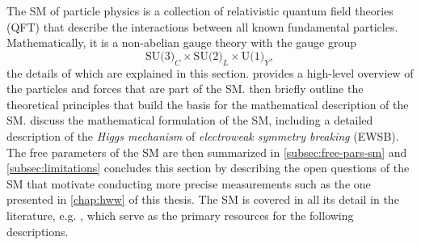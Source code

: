 

The SM of particle physics is a collection of relativistic quantum field theories (QFT) that describe the interactions between all known fundamental particles.
Mathematically, it is a non-abelian gauge theory with the gauge group
\begin{equation}
  \label{eq:sm-gauge-group}
  \text{SU(3)}_C \times \text{SU(2)}_L \times \text{U(1)}_Y,
\end{equation}
the details of which are explained in this section.
 provides a high-level overview of the particles and forces that are part of the SM.  then briefly outline the theoretical principles that build the basis for the mathematical description of the SM.  discuss the mathematical formulation of the SM, including a detailed description of the \emph{Higgs mechanism} of \emph{electroweak symmetry breaking} (EWSB).
The free parameters of the SM are then summarized in \cref{subsec:free-pars-sm} and \cref{subsec:limitations} concludes this section by describing the open questions of the SM that motivate conducting more precise measurements such as the one presented in \cref{chap:hww} of this thesis.
The SM is covered in all its detail in the literature, e.g. , which serve as the primary resources for the following descriptions.





